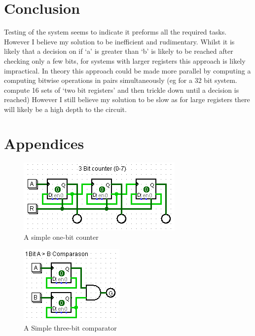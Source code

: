\documentclass[11pt, article]{article}
\begin{document}
    \section{Conclusion}
        Testing of the system seems to indicate it preforms all the required tasks. However I believe my solution to be inefficient and rudimentary. Whilst it is likely that a decision on if `a' is greater than `b' is likely to be reached after checking only a few bits, for systems with larger registers this approach is likely impractical. In theory this approach could be made more parallel by computing a computing bitwise operations in pairs simultaneously (eg for a 32 bit system. compute 16 sets of `two bit registers' and then trickle down until a decision is reached) However I still believe my solution to be slow as for large registers there will likely be a high depth to the circuit.

    \section{Appendices}
        \begin{figure}
            \centering
                \includegraphics[scale=1]{counter.png}
            \caption{A simple one-bit counter}
            \label{fig:counter}
        \end{figure}

        \begin{figure}
            \centering
                \includegraphics[scale=1]{comparitor.png}
            \caption{A Simple three-bit comparator}
            \label{fig:comparator}
        \end{figure}
\end{document}

